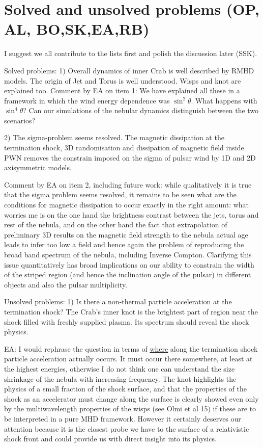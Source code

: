 \section{Solved and unsolved problems      (OP, AL, BO,SK,EA,RB)}
\label{sec:discussion}

I suggest we all contribute to the lists first and polish the discussion later (SSK). 

Solved problems: 
1) Overall dynamics of inner Crab is well described by RMHD models. The origin of Jet and Torus is well understood. Wisps and knot are explained too.
Comment by EA on item 1: We have explained all these in a framework in which the wind energy dependence was $\sin^2\theta$. What happens with $\sin^4\theta$? Can our simulations of the nebular dynamics distinguish between the two scenarios?

2) The sigma-problem seems resolved. The magnetic dissipation at the termination shock, 3D randomisation and dissipation of magnetic field inside PWN removes the constrain imposed on the sigma of pulsar wind by 1D and 2D axisymmetric models.

Comment by EA on item 2, including future work: while qualitatively it is true that the sigma problem seems resolved, it remains to be seen what are the conditions for magnetic dissipation to occur exactly in the right amount: what worries me is on the one hand the brightness contrast between the jets, torus and rest of the nebula, and on the other hand the fact that extrapolation of preliminary 3D results on the magnetic field strength to the nebula actual age leads to infer too low a field and hence again the problem of reproducing the broad band spectrum of the nebula, including Inverse Compton.
Clarifying this issue quantitatively has broad implications on our ability to constrain the width of the striped region (and hence the inclination angle of the pulsar) in different objects and also the pulsar multiplicity. 

Unsolved problems:
1) Is there a non-thermal particle acceleration at the termination shock? The Crab's inner knot is the brightest part of region near the shock filled with freshly supplied plasma. Its spectrum should reveal the shock physics. 

EA: I would rephrase the question in terms of \underline{where} along the termination shock particle acceleration actually occurs. It must occur there somewhere, at least at the highest energies, otherwise I do not think one can understand the size shrinkage of the nebula with increasing frequency. 
The knot highlights the physics of a small fraction of the shock surface, and that the properties of the shock as an accelerator must change along the surface is clearly showed even only by the multiwavelength properties of the wisps (see Olmi et al 15) if these are to be interpreted in a pure MHD framework. However it certainly deserves our attention because it is the closest probe we have to the surface of a relativistic shock front and could provide us with direct insight into its physics. 


